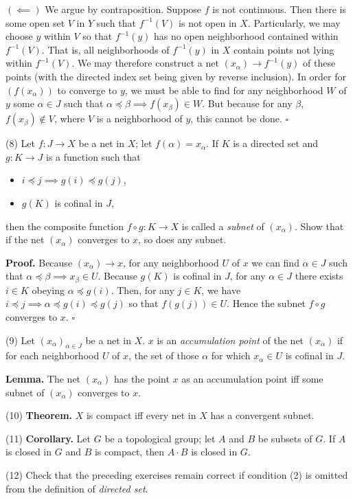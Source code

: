 \documentclass[a4paper]{article}
\begin{document}
$(\impliedby)$ We argue by contraposition. Suppose $f$ is not continuous. Then there is some open set $V$ in $Y$ such that $f^{-1}(V)$ is not open in $X$. Particularly, we may choose $y$ within $V$ so that $f^{-1}(y)$ has no open neighborhood contained within $f^{-1}(V)$. That is, all neighborhoods of $f^{-1}(y)$ in $X$ contain points not lying within $f^{-1}(V)$. We may therefore construct a net $(x_\alpha) \to f^{-1}(y)$ of these points (with the directed index set being given by reverse inclusion). In order for $(f(x_\alpha))$ to converge to $y$, we must be able to find for any neighborhood $W$ of $y$ some $\alpha \in J$ such that $\alpha \preceq \beta \implies f(x_\beta) \in W$. But because for any $\beta$, $f(x_\beta) \notin V$, where $V$ is a neighborhood of $y$, this cannot be done. $\square$

\vspace{0.5cm}

(8) Let $f : J \to X$ be a net in $X$; let $f(\alpha) = x_\alpha$. If $K$ is a directed set and $g : K \to J$ is a function such that

\begin{itemize}
    \item $i \preceq j \implies g(i) \preceq g(j)$,
    \item $g(K)$ is cofinal in $J$,
\end{itemize}

then the composite function $f \circ g : K \to X$ is called a \emph{subnet} of $(x_\alpha)$. Show that if the net $(x_\alpha)$ converges to $x$, so does any subnet.

\textbf{Proof.} Because $(x_\alpha) \to x$, for any neighborhood $U$ of $x$ we can find $\alpha \in J$ such that $\alpha \preceq \beta \implies x_\beta \in U$. Because $g(K)$ is cofinal in $J$, for any $\alpha \in J$ there exists $i \in K$ obeying $\alpha \preceq g(i)$. Then, for any $j \in K$, we have $i \preceq j \implies \alpha \preceq g(i) \preceq g(j)$ so that $f(g(j)) \in U$. Hence the subnet $f \circ g$ converges to $x$. $\square$

\vspace{0.5cm}

(9) Let $(x_\alpha)_{\alpha \in J}$ be a net in $X$. $x$ is an \emph{accumulation point} of the net $(x_\alpha)$ if for each neighborhood $U$ of $x$, the set of those $\alpha$ for which $x_\alpha \in U$ is cofinal in $J$.

\textbf{Lemma.} The net $(x_\alpha)$ has the point $x$ as an accumulation point iff some subnet of $(x_\alpha)$ converges to $x$.

(10) \textbf{Theorem.} $X$ is compact iff every net in $X$ has a convergent subnet.

(11) \textbf{Corollary.} Let $G$ be a topological group; let $A$ and $B$ be subsets of $G$. If $A$ is closed in $G$ and $B$ is compact, then $A \cdot B$ is closed in $G$.

(12) Check that the preceding exercises remain correct if condition (2) is omitted from the definition of \emph{directed set}.
\end{document}

